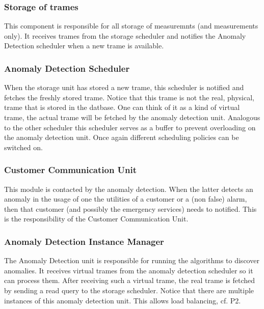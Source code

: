 \subsubsection{Storage of trames}

\npar This component is responsible for all storage of measuremnts (and
measurements only). It receives trames from the storage scheduler and notifies
the Anomaly Detection scheduler when a new trame is available.


\subsubsection{Anomaly Detection Scheduler}

\npar When the storage unit has stored a new trame, this scheduler is notified
and fetches the freshly stored trame. Notice that this trame is not
the real, physical, trame that is stored in the datbase. One can think of it as
a kind of virtual trame, the actual trame will be fetched by the anomaly
detection unit. Analogous to the other scheduler this scheduler serves as a
buffer to prevent overloading on the anomaly detection unit. Once again
different scheduling policies can be switched on.

\subsubsection{Customer Communication Unit}

\npar This module is contacted by the anomaly detection. When the latter detects
an anomaly in the usage of one the utilities of a customer or a (non false)
alarm, then that customer (and possibly the emergency services) needs to
notified. This is the responsibility of the Customer Communication Unit.

\subsubsection{Anomaly Detection Instance Manager}

\npar The Anomaly Detection unit is responsible for running the algorithms to
discover anomalies. It receives virtual trames from the anomaly detection
scheduler so it can process them. After receiving such a virtual trame, the
real trame is fetched by sending a read query to the storage scheduler. Notice
that there are multiple instances of this anomaly detection unit. This allows
load balancing, cf. P2. 

